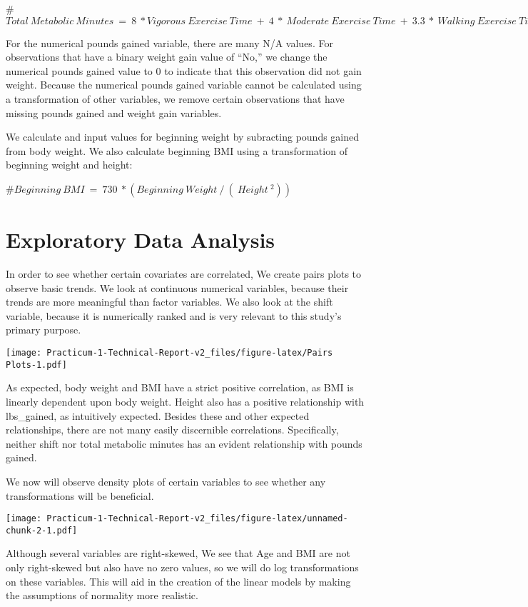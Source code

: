 \documentclass[]{article}
\begin{document}
\#\(Total\:Metabolic\:Minutes\:=\:8\:*Vigorous\:Exercise\:Time\:+\:4\:*\:Moderate\:Exercise\:Time\:+\:3.3\:*\:Walking\:Exercise\:Time\)

For the numerical pounds gained variable, there are many N/A values. For
observations that have a binary weight gain value of ``No,'' we change
the numerical pounds gained value to 0 to indicate that this observation
did not gain weight. Because the numerical pounds gained variable cannot
be calculated using a transformation of other variables, we remove
certain observations that have missing pounds gained and weight gain
variables.

We calculate and input values for beginning weight by subracting pounds
gained from body weight. We also calculate beginning BMI using a
transformation of beginning weight and height:

\#\(Beginning\:BMI\:=\:730\:*(Beginning\:Weight\:/\:(\:Height\:^2))\)

\hypertarget{exploratory-data-analysis}{%
\section{Exploratory Data Analysis}\label{exploratory-data-analysis}}

In order to see whether certain covariates are correlated, We create
pairs plots to observe basic trends. We look at continuous numerical
variables, because their trends are more meaningful than factor
variables. We also look at the shift variable, because it is numerically
ranked and is very relevant to this study's primary purpose.

\texttt{[image: Practicum-1-Technical-Report-v2\_files/figure-latex/Pairs Plots-1.pdf]}

As expected, body weight and BMI have a strict positive correlation, as
BMI is linearly dependent upon body weight. Height also has a positive
relationship with lbs\_gained, as intuitively expected. Besides these
and other expected relationships, there are not many easily discernible
correlations. Specifically, neither shift nor total metabolic minutes
has an evident relationship with pounds gained.

We now will observe density plots of certain variables to see whether
any transformations will be beneficial.

\texttt{[image: Practicum-1-Technical-Report-v2\_files/figure-latex/unnamed-chunk-2-1.pdf]}

Although several variables are right-skewed, We see that Age and BMI are
not only right-skewed but also have no zero values, so we will do log
transformations on these variables. This will aid in the creation of the
linear models by making the assumptions of normality more realistic.
\end{document}
